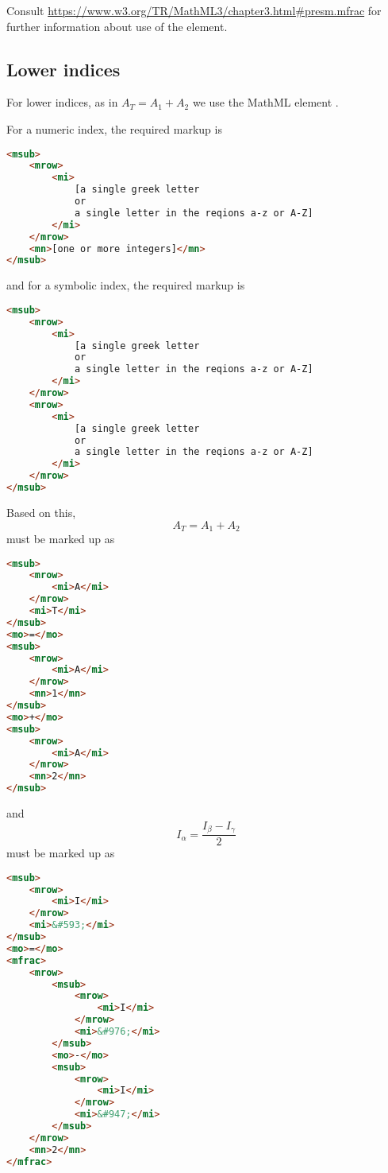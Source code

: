 \documentclass[english,a4paper,11pt]{article}
\begin{document}
\bigskip
Consult \url{https://www.w3.org/TR/MathML3/chapter3.html#presm.mfrac} for further information about use of the  element. 

\subsection{Lower indices}

For lower indices, as in $A_T = A_1 + A_2$ we use the MathML element .

For a numeric index, the required markup is 
\begin{lstlisting}[language=HTML]
<msub>
	<mrow>
		<mi>
			[a single greek letter 
			or 
			a single letter in the reqions a-z or A-Z]
		</mi>
	</mrow>
	<mn>[one or more integers]</mn>
</msub>
\end{lstlisting}
and for a symbolic index, the required markup is 
\begin{lstlisting}[language=HTML]
<msub>
	<mrow>
		<mi>
			[a single greek letter 
			or 
			a single letter in the reqions a-z or A-Z]
		</mi>
	</mrow>
	<mrow>
		<mi>
			[a single greek letter 
			or 
			a single letter in the reqions a-z or A-Z]
		</mi>
	</mrow>
</msub>
\end{lstlisting}

\begin{examples}
Based on this,
	\begin{equation} A_T = A_1 + A_2 \end{equation}
	must be marked up as
\begin{lstlisting}[language=HTML]
<msub>
	<mrow>
		<mi>A</mi>
	</mrow>
	<mi>T</mi>
</msub>
<mo>=</mo>
<msub>
	<mrow>
		<mi>A</mi>
	</mrow>
	<mn>1</mn>
</msub>
<mo>+</mo>
<msub>
	<mrow>
		<mi>A</mi>
	</mrow>
	<mn>2</mn>
</msub>
\end{lstlisting}
and
	\begin{equation} I_\alpha = \frac{I_\beta - I_\gamma}{2} \end{equation}
must be marked up as
\begin{lstlisting}[language=HTML]
<msub>
	<mrow>
		<mi>I</mi>
	</mrow>
	<mi>&#593;</mi>
</msub>
<mo>=</mo>
<mfrac>
	<mrow>
		<msub>
			<mrow>
				<mi>I</mi>
			</mrow>
			<mi>&#976;</mi>
		</msub>
		<mo>-</mo>
		<msub>
			<mrow>
				<mi>I</mi>
			</mrow>
			<mi>&#947;</mi>
		</msub>
	</mrow>
	<mn>2</mn>
</mfrac>
\end{lstlisting}
	
\end{examples}
\end{document}
